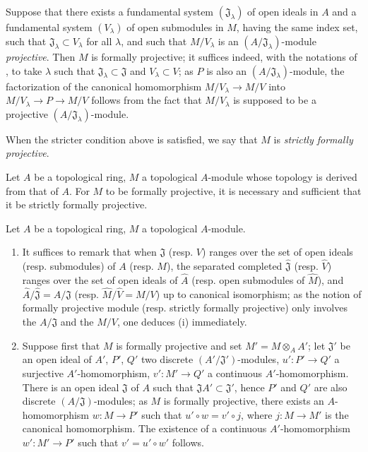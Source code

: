 \begin{env}[19.2.3]
\label{0.19.2.3}
Suppose that there exists a fundamental system $(\mathfrak{J}_\lambda)$ of open ideals in $A$ and a fundamental system $(V_\lambda)$ of open submodules in $M$, having the same index set, such that $\mathfrak{J}_\lambda\subset V_\lambda$ for all $\lambda$, and such that $M/V_\lambda$ is an $(A/\mathfrak{J}_\lambda)$-module \emph{projective}.
Then $M$ is formally projective;
it suffices indeed, with the notations of , to take $\lambda$ such that $\mathfrak{J}_\lambda\subset\mathfrak{J}$ and $V_\lambda\subset V$;
as $P$ is also an $(A/\mathfrak{J}_\lambda)$-module, the factorization of the canonical homomorphism $M/V_\lambda\to M/V$ into $M/V_\lambda\to P\to M/V$ follows from the fact that $M/V_\lambda$ is supposed to be a projective $(A/\mathfrak{J}_\lambda)$-module.

When the stricter condition above is satisfied, we say that $M$ is \emph{strictly formally projective}.
\end{env}

\begin{proposition}[19.2.4]
\label{0.19.2.4}
Let $A$ be a topological ring, $M$ a topological $A$-module whose topology is derived from that of $A$.
For $M$ to be formally projective, it is necessary and sufficient that it be strictly formally projective.
\end{proposition}

\begin{proposition}[19.2.5]
\label{0.19.2.5}
Let $A$ be a topological ring, $M$ a topological $A$-module.
\begin{enumerate}
  \item[(i)] It suffices to remark that when $\mathfrak{J}$ (resp. $V$) ranges over the set of open ideals (resp. submodules) of $A$ (resp. $M$), the separated completed $\widehat{\mathfrak{J}}$ (resp. $\widehat{V}$) ranges over the set of open ideals of $\widehat{A}$ (resp. open submodules of $\widehat{M}$), and $\widehat{A}/\widehat{\mathfrak{J}}=A/\mathfrak{J}$ (resp. $\widehat{M}/\widehat{V}=M/V$) up to canonical isomorphism;
  as the notion of formally projective module (resp. strictly formally projective) only involves the $A/\mathfrak{J}$ and the $M/V$, one deduces (i) immediately.
  \item[(ii)] Suppose first that $M$ is formally projective and set $M'=M\otimes_A A'$;
  let $\mathfrak{J}'$ be an open ideal of $A'$, $P'$, $Q'$ two discrete $(A'/\mathfrak{J}')$-modules, $u':P'\to Q'$ a surjective $A'$-homomorphism, $v':M'\to Q'$ a continuous $A'$-homomorphism.
  There is an open ideal $\mathfrak{J}$ of $A$ such that $\mathfrak{J}A'\subset\mathfrak{J}'$, hence $P'$ and $Q'$ are also discrete $(A/\mathfrak{J})$-modules;
  as $M$ is formally projective, there exists an $A$-homomorphism $w:M\to P'$ such that $u'\circ w=v'\circ j$, where $j:M\to M'$ is the canonical homomorphism.
  The existence of a continuous $A'$-homomorphism $w':M'\to P'$ such that $v'=u'\circ w'$ follows.
\end{enumerate}
\end{proposition}

